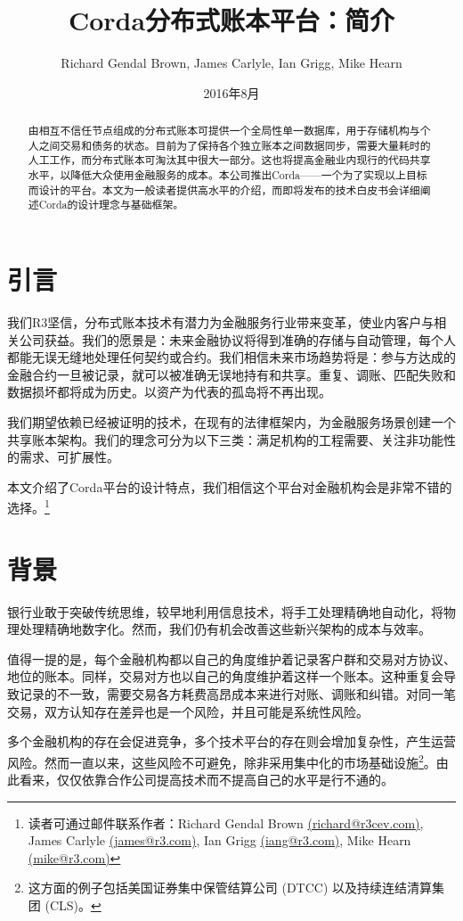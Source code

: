 \documentclass[UTF8]{ctexart}
\author{Richard Gendal Brown, James Carlyle, Ian Grigg, Mike Hearn}
\date{2016年8月}
\title{Corda分布式账本平台：简介}
\begin{document}
\maketitle 
\begin{abstract}
由相互不信任节点组成的分布式账本可提供一个全局性单一数据库，用于存储机构与个人之间交易和债务的状态。目前为了保持各个独立账本之间数据同步，需要大量耗时的人工工作，而分布式账本可淘汰其中很大一部分。这也将提高金融业内现行的代码共享水平，以降低大众使用金融服务的成本。本公司推出Corda——一个为了实现以上目标而设计的平台。本文为一般读者提供高水平的介绍，而即将发布的技术白皮书会详细阐述Corda的设计理念与基础框架。
\end{abstract}
\newpage
\tableofcontents
\newpage
\section{引言}
我们R3坚信，分布式账本技术有潜力为金融服务行业带来变革，使业内客户与相关公司获益。我们的愿景是：未来金融协议将得到准确的存储与自动管理，每个人都能无误无缝地处理任何契约或合约。我们相信未来市场趋势将是：参与方达成的金融合约一旦被记录，就可以被准确无误地持有和共享。重复、调账、匹配失败和数据损坏都将成为历史。以资产为代表的孤岛将不再出现。

我们期望依赖已经被证明的技术，在现有的法律框架内，为金融服务场景创建一个共享账本架构。我们的理念可分为以下三类：满足机构的工程需要、关注非功能性的需求、可扩展性。

本文介绍了Corda平台的设计特点，我们相信这个平台对金融机构会是非常不错的选择。\footnote{读者可通过邮件联系作者：Richard Gendal Brown \href{mailto:richard@r3cev.com}{(richard@r3cev.com)}, James Carlyle \href{mailto:james@r3.com}{(james@r3.com)}, Ian Grigg \href{mailto:iang@r3.com}{(iang@r3.com)}, Mike Hearn \href{mailto:mike@r3.com}{(mike@r3.com)}}

\section{背景}
银行业敢于突破传统思维，较早地利用信息技术，将手工处理精确地自动化，将物理处理精确地数字化。然而，我们仍有机会改善这些新兴架构的成本与效率。 

值得一提的是，每个金融机构都以自己的角度维护着记录客户群和交易对方协议、地位的账本。同样，交易对方也以自己的角度维护着这样一个账本。这种重复会导致记录的不一致，需要交易各方耗费高昂成本来进行对账、调账和纠错。对同一笔交易，双方认知存在差异也是一个风险，并且可能是系统性风险。

多个金融机构的存在会促进竞争，多个技术平台的存在则会增加复杂性，产生运营风险。然而一直以来，这些风险不可避免，除非采用集中化的市场基础设施\footnote{这方面的例子包括美国证券集中保管结算公司 (DTCC) 以及持续连结清算集团 (CLS)。}。由此看来，仅仅依靠合作公司提高技术而不提高自己的水平是行不通的。
\end{document}
